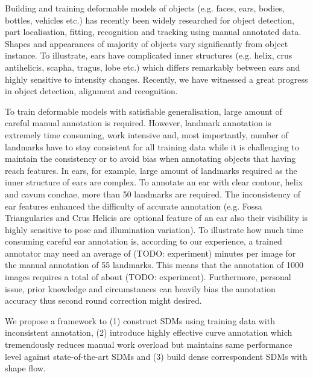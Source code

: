 Building and training deformable models of objects (e.g. faces, ears, bodies, bottles, vehicles etc.) has recently been widely researched for object detection, part localisation, fitting, recognition and tracking using manual annotated data. Shapes and appearances of majority of objects vary significantly from object instance. To illustrate, ears have complicated inner structures (e.g. helix, crus antihelicis, scapha, tragus, lobe etc.) which differs remarkably between ears and highly sensitive to intensity changes. Recently, we have witnessed a great progress in object detection, alignment and recognition. 

To train deformable models with satisfiable generalisation, large amount of careful manual annotation is required. However, landmark annotation is extremely time consuming, work intensive and, most importantly, number of landmarks have to stay consistent for all training data while it is challenging to maintain the consistency or to avoid bias when annotating objects that having reach features. In ears, for example, large amount of landmarks required as the inner structure of ears are complex. To annotate an ear with clear contour, helix and cavum conchae, more than 50 landmarks are required. The inconsistency of ear features enhanced the difficulty of accurate annotation (e.g. Fossa Triangularies and Crus Helicis are optional feature of an ear also their visibility is highly sensitive to pose and illumination variation).
To illustrate how much time consuming careful ear annotation is, according to our experience, a trained annotator may need an average of (TODO: experiment) minutes per image for the manual annotation of 55 landmarks. This means that the annotation of 1000 images requires a total of about (TODO: experiment). Furthermore, personal issue, prior knowledge and circumstances can heavily bias the annotation accuracy thus second round correction might desired.

We propose a framework to (1) construct SDMs using training data with inconsistent annotation, (2) introduce highly effective curve annotation which tremendously reduces manual work overload but maintains same performance level against state-of-the-art SDMs and (3) build dense correspondent SDMs with shape flow. 


